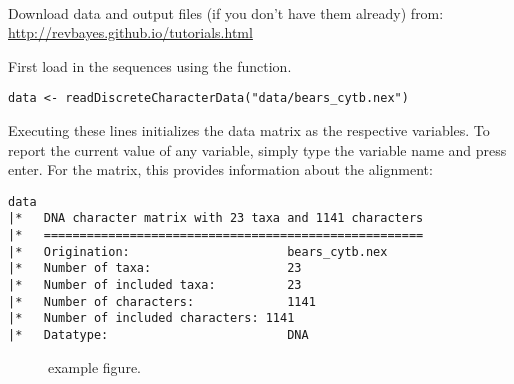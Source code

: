 \noindent \\ \impmark Download data and output files (if you don't have them already) from: \\ \href{http://revbayes.github.io/tutorials.html}{http://revbayes.github.io/tutorials.html}


First load in the sequences using the  function. 
{\tt \begin{snugshade*}
\begin{lstlisting}
data <- readDiscreteCharacterData("data/bears_cytb.nex")
\end{lstlisting}
\end{snugshade*}}
Executing these lines initializes the data matrix as the respective \Rev variables. 
To report the current value of any variable, simply type the variable name and press enter. For the  matrix, this provides information about the alignment:
{\tt \begin{snugshade*}
\begin{lstlisting}
data
|*   DNA character matrix with 23 taxa and 1141 characters
|*   =====================================================
|*   Origination:                      bears_cytb.nex
|*   Number of taxa:                   23
|*   Number of included taxa:          23
|*   Number of characters:             1141
|*   Number of included characters: 1141
|*   Datatype:                         DNA
\end{lstlisting}
\end{snugshade*}}

\begin{figure}[htbp!]
\centering
{}
\caption{\small example figure.}
\label{fig:example}
\end{figure}



